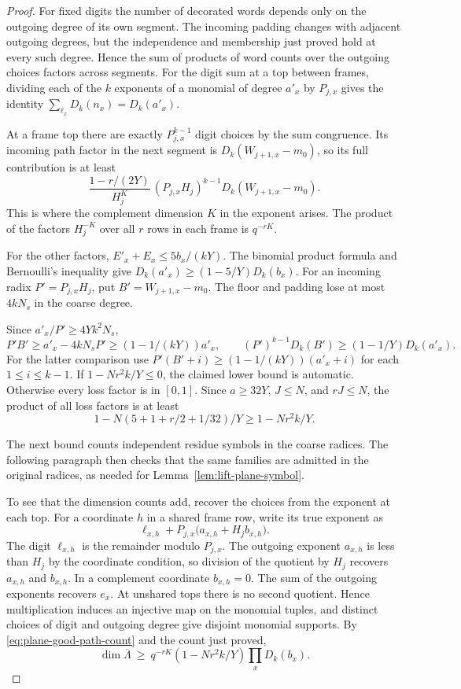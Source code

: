\begin{proof}
For fixed digits the number of decorated words depends only on the outgoing degree
of its own segment. The incoming padding changes with adjacent
outgoing degrees, but the independence and membership just
proved hold at every such degree. Hence the sum of products
of word counts over the outgoing choices factors across segments.
For the digit sum at a top between frames, dividing each of the
\(k\) exponents of a monomial of degree \(a'_x\) by \(P_{j,x}\)
gives the identity \(\sum_{\ell_x} D_k(n_x)=D_k(a'_x)\).

At a frame top there are exactly \(P_{j,x}^{k-1}\) digit choices
by the sum congruence. Its incoming path factor in the next
segment is \(D_k(W_{j+1,x}-m_0)\), so its full contribution is
at least
\[
 \frac{1-r/(2Y)}{H_j^K}\,
 (P_{j,x}H_j)^{k-1}D_k(W_{j+1,x}-m_0).
\]
This is where the complement dimension \(K\) in the exponent
arises. The product of the factors \(H_j^{-K}\) over all \(r\)
rows in each frame is \(q^{-rK}\).

For the other factors, \(E'_x+E_x\le5b_x/(kY)\).
The binomial product formula and Bernoulli's inequality give
\(D_k(a'_x)\ge(1-5/Y)D_k(b_x)\). For an incoming radix
\(P'=P_{j,x}H_j\), put \(B'=W_{j+1,x}-m_0\). The floor and
padding lose at most \(4kN_s\) in the coarse degree.

Since
\(a'_x/P'\ge 4Yk^2N_s\),
\[
 P'B'\ge a'_x-4kN_sP'\ge(1-1/(kY))a'_x,\qquad
 (P')^{k-1}D_k(B')\ge(1-1/Y)D_k(a'_x).
\]
For the latter comparison use \(P'(B'+i)\ge(1-1/(kY))(a'_x+i)\)
for each \(1\le i\le k-1\). If \(1-Nr^2k/Y\le0\), the
claimed lower bound is automatic. Otherwise every loss factor
is in \([0,1]\). Since \(a\ge32Y\), \(J\le N\), and \(rJ\le N\),
the product of all loss factors is at least
\[
 1-N(5+1+r/2+1/32)/Y\ge 1-Nr^2k/Y.
\]

The next bound counts independent residue symbols in the
coarse radices. The following paragraph then checks that the
same families are admitted in the original radices, as needed
for Lemma~\ref{lem:lift-plane-symbol}.

To see that the dimension counts add, recover the choices from
the exponent at each top. For a coordinate \(h\) in a shared
frame row, write its true exponent as
\[
 \ell_{x,h}+P_{j,x}\bigl(a_{x,h}+H_j b_{x,h}\bigr).
\]
The digit \(\ell_{x,h}\) is the remainder modulo \(P_{j,x}\).
The outgoing exponent \(a_{x,h}\) is less than \(H_j\)
by the coordinate condition, so division of the quotient by
\(H_j\) recovers \(a_{x,h}\) and \(b_{x,h}\). In a complement
coordinate \(b_{x,h}=0\). The sum of the outgoing exponents
recovers \(e_x\). At unshared tops there is no second quotient.
Hence multiplication induces an injective map on the monomial
tuples, and distinct choices of digit and outgoing degree give
disjoint monomial supports. By
\eqref{eq:plane-good-path-count} and the count just proved,
\begin{equation}\label{eq:plane-coarse-rank}
 \dim \overline\Lambda\ \ge\ q^{-rK}(1-Nr^2k/Y)\prod_xD_k(b_x).
\end{equation}

\end{proof}

